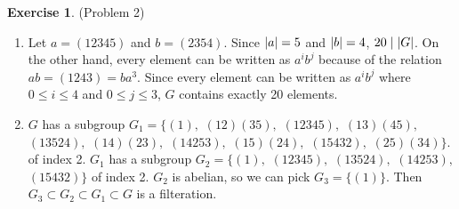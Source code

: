 \documentclass[12pt, psamsfonts]{amsart}
\theoremstyle{definition}
\newtheorem*{exer}{Exercise}
\theoremstyle{remark}
\numberwithin{equation}{section}
\begin{document}
\begin{exer}{(Problem 2)}
  \begin{enumerate}[label=(\roman*)]
    \item 
      Let $a = (12345)$ and $b = (2354)$.
      Since $\abs{a} = 5$ and $\abs{b} = 4$, $20 \mid \abs{G}$.
      On the other hand, every element can be written as $a^ib^j$ because of the relation $ab = (1243) = ba^3$.
      Since every element can be written as $a^ib^j$ where $0 \leq i \leq 4$ and $0 \leq j \leq 3$, $G$ contains exactly 20 elements.
    \item
      $G$ has a subgroup $G_1 = \{(1),$ $(12)(35),$ $(12345),$ $(13)(45),$ $(13524),$ $(14)(23),$ $(14253),$ $(15)(24),$ $(15432),$ $(25)(34)\}$.
      of index 2.
      $G_1$ has a subgroup $G_2 = \{(1),$ $(12345),$ $(13524),$ $(14253),$ $(15432)\}$ of index 2.
      $G_2$ is abelian, so we can pick $G_3 = \{(1)\}$.
      Then $G_3 \subset G_2 \subset G_1 \subset G$ is a filteration. 
  \end{enumerate}
\end{exer}
\end{document}
